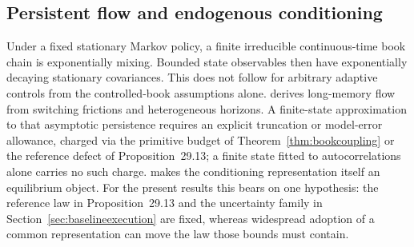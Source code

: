 \subsection{Persistent flow and endogenous conditioning}
Under a fixed stationary Markov policy, a finite irreducible
continuous-time book chain is exponentially mixing. Bounded state observables
then have exponentially decaying stationary covariances. This does not follow
for arbitrary adaptive controls from the controlled-book assumptions alone.
\citet{RodriguezDominguez2026Switching} derives long-memory flow from switching frictions
and heterogeneous horizons. A finite-state approximation to that asymptotic persistence requires
an explicit truncation or model-error allowance, charged via
the primitive budget of Theorem~\ref{thm:bookcoupling} or the reference defect
of Proposition~29.13; a finite state fitted to autocorrelations alone carries no
such charge. \citet{RodriguezDominguez2026Market} makes the conditioning
representation itself an equilibrium object. For the present results this bears
on one hypothesis: the reference law in Proposition~29.13 and the uncertainty
family in Section~\ref{sec:baselineexecution} are fixed, whereas widespread adoption of a common
representation can move the law those bounds must contain.

